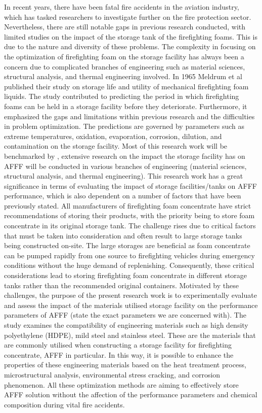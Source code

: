 \documentclass[12pt]{report}
\begin{document}
In recent years, there have been fatal fire accidents in the aviation industry, which has tasked researchers to investigate further on the fire protection sector. Nevertheless, there are still notable gaps in previous research conducted, with limited studies on the impact of the storage tank of the firefighting foams. This is due to the nature and diversity of these problems. The complexity in focusing on the optimization of firefighting foam on the storage facility has always been a concern due to complicated branches of engineering such as material sciences, structural analysis, and thermal engineering involved. 
In 1965 Meldrum et al \cite{meldrum1965storage} published their study on storage life and utility of mechanical firefighting foam liquids. The study contributed to predicting the period in which firefighting foams can be held in a storage facility before they deteriorate. Furthermore, it emphasized the gaps and limitations within previous research and the difficulties in problem optimization. The predictions are governed by parameters such as extreme temperatures, oxidation, evaporation, corrosion, dilution, and contamination on the storage facility. Most of this research work will be benchmarked by \cite{meldrum1965storage}, extensive research on the impact the storage facility has on AFFF will be conducted in various branches of engineering (material sciences, structural analysis, and thermal engineering).
This research work has a great significance in terms of evaluating the impact of storage facilities/tanks on AFFF performance, which is also dependent on a number of factors that have been previously stated. All manufacturers of firefighting foam concentrate have strict recommendations of storing their products, with the priority being to store foam concentrate in its original storage tank. The challenge rises due to critical factors that must be taken into consideration and often result to large storage tanks being constructed on-site. The large storages are beneficial as foam concentrate can be pumped rapidly from one source to firefighting vehicles during emergency conditions without the huge demand of replenishing. Consequently, these critical considerations lead to storing firefighting foam concentrate in different storage tanks rather than the recommended original containers.
 Motivated by these challenges, the purpose of the present research work is to experimentally evaluate and assess the impact of the materials utilised storage facility on the performance parameters of AFFF (state the exact parameters we are concerned with). The study examines the compatibility of engineering materials such as high density polyethylene (HDPE), mild steel and stainless steel. These are the materials that are commonly utilised when constructing a storage facility for firefighting concentrate, AFFF in particular. In this way, it is possible to enhance the properties of these engineering materials based on the heat treatment process, microstructural analysis, environmental stress cracking, and corrosion phenomenon. All these optimization methods are aiming to effectively store AFFF solution without the affection of the performance parameters and chemical composition during vital fire accidents. 
\end{document}

